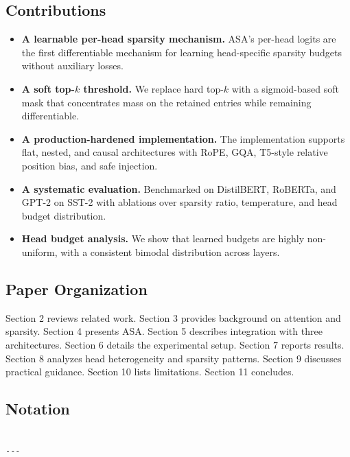 \subsection{Contributions}

\begin{itemize}
\item \textbf{A learnable per-head sparsity mechanism.} ASA's per-head logits are the
  first differentiable mechanism for learning head-specific sparsity budgets
  without auxiliary losses.
\item \textbf{A soft top-$k$ threshold.} We replace hard top-$k$ with a sigmoid-based
  soft mask that concentrates mass on the retained entries while remaining
  differentiable.
\item \textbf{A production-hardened implementation.} The implementation supports flat,
  nested, and causal architectures with RoPE, GQA, T5-style relative position
  bias, and safe injection.
\item \textbf{A systematic evaluation.} Benchmarked on DistilBERT, RoBERTa, and GPT-2
  on SST-2 with ablations over sparsity ratio, temperature, and head budget
  distribution.
\item \textbf{Head budget analysis.} We show that learned budgets are highly non-uniform,
  with a consistent bimodal distribution across layers.

\end{itemize}
\subsection{Paper Organization}

Section 2 reviews related work. Section 3 provides background on attention and 
sparsity. Section 4 presents ASA. Section 5 describes integration with three 
architectures. Section 6 details the experimental setup. Section 7 reports 
results. Section 8 analyzes head heterogeneity and sparsity patterns. Section 
9 discusses practical guidance. Section 10 lists limitations. Section 11 
concludes.



\subsection{Notation}

\begin{lstlisting}

---
\end{lstlisting}